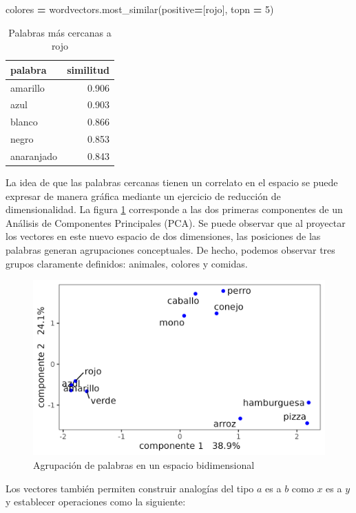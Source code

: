 \documentclass[
  12pt,
]{article}
\newenvironment{Shaded}{\begin{snugshade}}{\end{snugshade}}
\newcommand{\DecValTok}[1]{\textcolor[rgb]{0.00,0.00,0.81}{#1}}
\newcommand{\NormalTok}[1]{#1}
\newcommand{\OperatorTok}[1]{\textcolor[rgb]{0.81,0.36,0.00}{\textbf{#1}}}
\newcommand{\StringTok}[1]{\textcolor[rgb]{0.31,0.60,0.02}{#1}}
\begin{document}
\begin{Shaded}
\begin{Highlighting}[]
\NormalTok{colores }\OperatorTok{=}\NormalTok{  wordvectors.most\_similar(positive}\OperatorTok{=}\NormalTok{[}\StringTok{\textquotesingle{}rojo\textquotesingle{}}\NormalTok{],  topn }\OperatorTok{=} \DecValTok{5}\NormalTok{)}
\end{Highlighting}
\end{Shaded}

\begin{table}[H]

\caption{\label{tab:tabla_colores}Palabras más cercanas a rojo}
\centering
\begin{tabular}[t]{lr}
\toprule
palabra & similitud\\
\midrule
amarillo & 0.906\\
azul & 0.903\\
blanco & 0.866\\
negro & 0.853\\
anaranjado & 0.843\\
\bottomrule
\end{tabular}
\end{table}

La idea de que las palabras cercanas tienen un correlato en el espacio
se puede expresar de manera gráfica mediante un ejercicio de reducción
de dimensionalidad. La figura \ref{plot_pca_ejemplo} corresponde a las
dos primeras componentes de un Análisis de Componentes Principales
(PCA). Se puede observar que al proyectar los vectores en este nuevo
espacio de dos dimensiones, las posiciones de las palabras generan
agrupaciones conceptuales. De hecho, podemos observar tres grupos
claramente definidos: animales, colores y comidas.

\begin{figure}[H]
\centering
\large
\caption{Agrupación de palabras en un espacio bidimensional}
\label{plot_pca_ejemplo}
\includegraphics[width = 0.5 \textwidth]{cuadros_tesis/plot_pca.png}
\normalsize
\end{figure}

Los vectores también permiten construir analogías del tipo \(a\) es a
\(b\) como \(x\) es a \(y\) y establecer operaciones como la siguiente:
\end{document}
